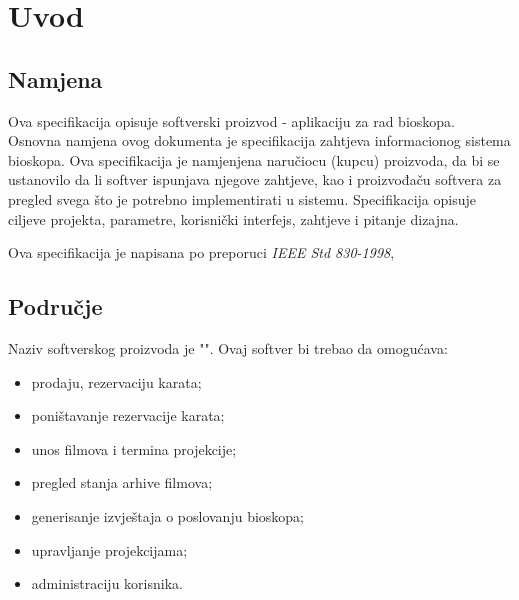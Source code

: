 \chapter{Uvod}
\section{Namjena}

Ova specifikacija opisuje softverski proizvod - aplikaciju za rad bioskopa. Osnovna namjena ovog dokumenta je specifikacija zahtjeva informacionog sistema bioskopa.
Ova specifikacija je namjenjena naručiocu (kupcu) proizvoda, da bi se ustanovilo da li softver ispunjava njegove zahtjeve, kao i proizvođaču softvera za pregled svega što je potrebno implementirati u sistemu. Specifikacija opisuje ciljeve projekta, parametre, korisnički interfejs, zahtjeve i pitanje dizajna.

Ova specifikacija je napisana po preporuci \textit{IEEE Std 830-1998},
\section{Područje}

Naziv softverskog proizvoda je "\naziv". Ovaj softver bi trebao da omogućava:
\begin{itemize}
  \item prodaju, rezervaciju karata;
  \item poništavanje rezervacije karata;
  \item unos filmova i termina projekcije;
  \item pregled stanja arhive filmova;
  \item generisanje izvještaja o poslovanju bioskopa;
  \item upravljanje projekcijama;
  \item administraciju korisnika.
\end{itemize}

